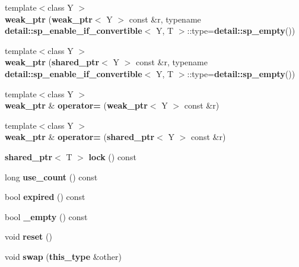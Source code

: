 \begin{DoxyCompactItemize}
\item 
{\footnotesize template$<$class Y $>$ }\\{\bfseries weak\-\_\-ptr} ({\bf weak\-\_\-ptr}$<$ Y $>$ const \&r, typename {\bf detail\-::sp\-\_\-enable\-\_\-if\-\_\-convertible}$<$ Y, T $>$\-::type={\bf detail\-::sp\-\_\-empty}())\label{classbooster_1_1weak__ptr_a024245854350fceeacfd2cc697fa2766}

\item 
{\footnotesize template$<$class Y $>$ }\\{\bfseries weak\-\_\-ptr} ({\bf shared\-\_\-ptr}$<$ Y $>$ const \&r, typename {\bf detail\-::sp\-\_\-enable\-\_\-if\-\_\-convertible}$<$ Y, T $>$\-::type={\bf detail\-::sp\-\_\-empty}())\label{classbooster_1_1weak__ptr_a58ef0b8a6decf6619ad1617a2fa1dfd9}

\item 
{\footnotesize template$<$class Y $>$ }\\{\bf weak\-\_\-ptr} \& {\bfseries operator=} ({\bf weak\-\_\-ptr}$<$ Y $>$ const \&r)\label{classbooster_1_1weak__ptr_a6aaf5ebf622698f39eeaa3b26407b941}

\item 
{\footnotesize template$<$class Y $>$ }\\{\bf weak\-\_\-ptr} \& {\bfseries operator=} ({\bf shared\-\_\-ptr}$<$ Y $>$ const \&r)\label{classbooster_1_1weak__ptr_a3f90497217adaf9deb61df27c2690a6a}

\item 
{\bf shared\-\_\-ptr}$<$ T $>$ {\bfseries lock} () const \label{classbooster_1_1weak__ptr_aaa901127382ac08b3ff9ae1e7d73562b}

\item 
long {\bfseries use\-\_\-count} () const \label{classbooster_1_1weak__ptr_ac56c9a23fd4d8c10577217ce1b67fefb}

\item 
bool {\bfseries expired} () const \label{classbooster_1_1weak__ptr_a6c9ffc68620747ac35daf23abacd03dd}

\item 
bool {\bfseries \-\_\-empty} () const \label{classbooster_1_1weak__ptr_a5542a1c96988b75ed396a7152c61d2dd}

\item 
void {\bfseries reset} ()\label{classbooster_1_1weak__ptr_a9f7c81a5b633fefbf85b884344b93749}

\item 
void {\bfseries swap} ({\bf this\-\_\-type} \&other)\label{classbooster_1_1weak__ptr_aeb4c669b4fec5e924788445ebc24c6a8}


\end{DoxyCompactItemize}
